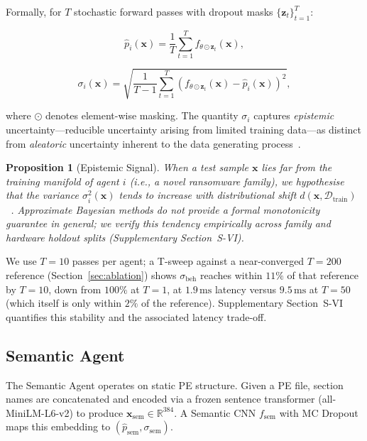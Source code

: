 \documentclass[journal]{IEEEtran}
\newcommand{\R}{\mathbb{R}}
\newtheorem{proposition}{Proposition}
\begin{document}
Formally, for $T$ stochastic forward passes with dropout masks
$\{\mathbf{z}_t\}_{t=1}^T$:

\begin{equation}\label{eq:mc_mean}
  \hat{p}_i(\mathbf{x}) = \frac{1}{T} \sum_{t=1}^{T}
    f_{\theta \odot \mathbf{z}_t}(\mathbf{x}),
\end{equation}

\begin{equation}\label{eq:mc_std}
  \sigma_i(\mathbf{x}) = \sqrt{\frac{1}{T-1} \sum_{t=1}^{T}
    \left(f_{\theta \odot \mathbf{z}_t}(\mathbf{x}) - \hat{p}_i(\mathbf{x})
    \right)^2},
\end{equation}

where $\odot$ denotes element-wise masking. The quantity $\sigma_i$ captures
\emph{epistemic} uncertainty---reducible uncertainty arising from limited
training data---as distinct from \emph{aleatoric} uncertainty inherent to the
data generating process~\cite{kendall2017uncertainties}.

\begin{proposition}[Epistemic Signal]\label{prop:epistemic}
When a test sample $\mathbf{x}$ lies far from the training manifold of agent
$i$ (i.e., a novel ransomware family), we hypothesise that the variance
$\sigma_i^2(\mathbf{x})$ tends to increase with distributional shift
$d(\mathbf{x}, \mathcal{D}_{\text{train}})$~\cite{gal2016dropout}.
Approximate Bayesian methods do not provide a formal monotonicity guarantee
in general; we verify this tendency empirically across family and hardware
holdout splits (Supplementary Section~S-VI).
\end{proposition}

We use $T=10$ passes per agent; a T-sweep against a near-converged $T{=}200$
reference (Section~\ref{sec:ablation}) shows $\sigma_{\text{beh}}$ reaches
within $11\%$ of that reference by $T{=}10$, down from $100\%$ at $T{=}1$,
at $1.9\,\text{ms}$ latency versus $9.5\,\text{ms}$ at $T{=}50$ (which itself
is only within $2\%$ of the reference). Supplementary Section~S-VI
quantifies this stability and the associated latency trade-off.

\subsection{Semantic Agent}

The Semantic Agent operates on static PE structure. Given a PE file, section
names are concatenated and encoded via a frozen sentence transformer
(all-MiniLM-L6-v2) to produce $\mathbf{x}_{\text{sem}} \in \R^{384}$.
A Semantic CNN $f_{\text{sem}}$ with MC Dropout maps this embedding to
$(\hat{p}_{\text{sem}}, \sigma_{\text{sem}})$.
\end{document}
